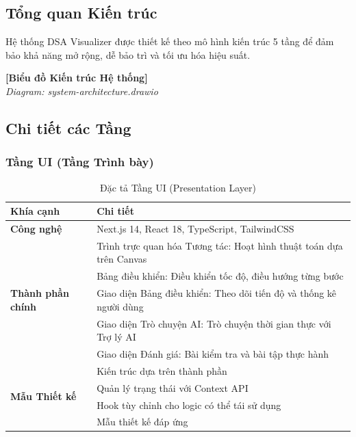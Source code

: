 \subsection{Tổng quan Kiến trúc}
\label{subsec:architecture-overview}

Hệ thống DSA Visualizer được thiết kế theo mô hình kiến trúc 5 tầng để đảm bảo khả năng mở rộng, dễ bảo trì và tối ưu hóa hiệu suất.

\begin{center}
\textbf{[Biểu đồ Kiến trúc Hệ thống]}\\
\textit{Diagram: system-architecture.drawio}
\end{center}

\subsection{Chi tiết các Tầng}

\subsubsection{Tầng UI (Tầng Trình bày)}

\begin{table}[H]
\centering
\caption{Đặc tả Tầng UI (Presentation Layer)}
\label{tab:ui-layer-specs}
\begin{tabular}{|p{3cm}|p{10cm}|}
\hline
\textbf{Khía cạnh} & \textbf{Chi tiết} \\
\hline
\textbf{Công nghệ} & Next.js 14, React 18, TypeScript, TailwindCSS \\
\hline
\multirow{5}{3cm}{\textbf{Thành phần chính}} 
& Trình trực quan hóa Tương tác: Hoạt hình thuật toán dựa trên Canvas \\
\cline{2-2}
& Bảng điều khiển: Điều khiển tốc độ, điều hướng từng bước \\
\cline{2-2}
& Giao diện Bảng điều khiển: Theo dõi tiến độ và thống kê người dùng \\
\cline{2-2}
& Giao diện Trò chuyện AI: Trò chuyện thời gian thực với Trợ lý AI \\
\cline{2-2}
& Giao diện Đánh giá: Bài kiểm tra và bài tập thực hành \\
\hline
\multirow{4}{3cm}{\textbf{Mẫu Thiết kế}} 
& Kiến trúc dựa trên thành phần \\
\cline{2-2}
& Quản lý trạng thái với Context API \\
\cline{2-2}
& Hook tùy chỉnh cho logic có thể tái sử dụng \\
\cline{2-2}
& Mẫu thiết kế đáp ứng \\
\hline
\end{tabular}
\end{table}

